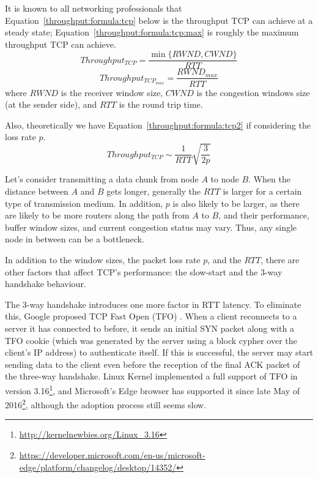 It is known to all networking professionals that Equation~\ref{throughput:formula:tcp}  below is the throughput TCP can achieve at a steady state; Equation~\ref{throughput:formula:tcp:max} is roughly the maximum throughput TCP can achieve. 
\begin{equation}\label{throughput:formula:tcp}
Throughput_{TCP} = \frac{\min\{RWND, CWND\}}{RTT}
\end{equation}
\begin{equation}\label{throughput:formula:tcp:max}
Throughput_{TCP_{max}} = \frac{RWND_{max}}{RTT}
\end{equation}
where $RWND$ is the receiver window size, $CWND$ is the congestion windows size (at the sender side), and $RTT$ is the round trip time. 

Also, theoretically we have Equation~\ref{throughput:formula:tcp2} if considering the loss rate $p$. 
\begin{equation}\label{throughput:formula:tcp2}
Throughput_{TCP} \sim \frac{1}{RTT} \sqrt{\frac{3}{2p}}
\end{equation}

Let's consider transmitting a data chunk from node $A$ to node $B$. When the distance between $A$ and $B$ gets longer, generally the $RTT$ is larger for a certain type of transmission medium. In addition, $p$ is also likely to be larger, as there are likely to be more routers along the path from $A$ to $B$, and their performance, buffer window sizes, and current congestion status may vary. Thus, any single node in between can be a bottleneck. 

In addition to the window sizes, the packet loss rate $p$, and the $RTT$, there are other factors that affect TCP's performance: the slow-start and the 3-way handshake behaviour. 

The 3-way handshake introduces one more factor in RTT latency. To eliminate this, Google proposed TCP Fast Open (TFO) \cite{rfc7413}. When a client reconnects to a server it has connected to before, it sends an initial SYN packet along with a TFO cookie (which was generated by the server using a block cypher over the client's IP address) to authenticate itself. If this is successful, the server may start sending data to the client even before the reception of the final ACK packet of the three-way handshake. Linux Kernel implemented a full support of TFO in version 3.16\footnote{\url{http://kernelnewbies.org/Linux_3.16}}, and Microsoft's Edge browser has supported it since late May of 2016\footnote{\url{https://developer.microsoft.com/en-us/microsoft-edge/platform/changelog/desktop/14352/}}, although the adoption process still seems slow. 

